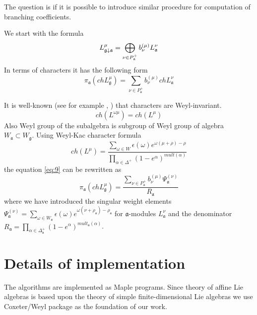 \documentclass[a4paper,12pt]{article}
\theoremstyle{definition} \newtheorem{Def}{Definition}
\begin{document}
The question is if it is possible to introduce similar procedure for
computation of branching coefficients. 

We start with the formula
\begin{equation}
  \label{eq:6}
  L_{\frak{g}\downarrow \frak{a}}^{\mu }=\bigoplus\limits_{\nu \in P_{\frak{a}%
    }^{+}}b_{\nu }^{\left( \mu \right) }L_{\frak{a}}^{\nu }
\end{equation}
In terms of characters it has the following form
\begin{equation}
  \label{eq:9}
  \pi_{\mathfrak{a}}(ch L^{\mu}_{\mathfrak{g}})=\sum_{\nu\in P^{+}_{\mathfrak{a}}}b^{(\mu)}_{\nu} ch L^{\nu}_{\mathfrak{a}}
\end{equation}

It is well-known (see for example \cite{wakimoto2001idl}, \cite{kac1990idl}) that characters are Weyl-invariant.
\begin{equation}
  \label{eq:8}
  ch(L^{\omega\mu})=ch(L^{\mu})
\end{equation}
Also Weyl group of the subalgebra is subgroup of Weyl group of algebra $W_{\mathfrak{a}}\subset W_{\mathfrak{g}}$.
Using Weyl-Kac character formula
\begin{equation}
  \label{eq:11}
  ch(L^{\mu})=\frac{\sum_{\omega\in W}\epsilon(\omega)e^{\omega(\mu+\rho)-\rho}}{\prod_{\alpha\in \Delta^{+}}(1-e^{\alpha})^{mult(\alpha)}}
\end{equation}
the equation \eqref{eq:9} can be rewritten as
\begin{equation}
  \label{eq:10}
  \pi_{\mathfrak{a}}(ch L^{\mu}_{\mathfrak{g}})=\frac{\sum_{\nu\in P^{+}_{\mathfrak{a}}}b^{(\mu)}_{\nu} \Psi^{(\nu)}_{\mathfrak{a}}}{R_{\mathfrak{a}}}
\end{equation}
where we have introduced the singular weight elements $\Psi^{(\nu)}_{\mathfrak{a}}=\sum_{\omega\in W_{\mathfrak{a}}}\epsilon(\omega)e^{\omega(\nu+\rho_{\mathfrak{a}})-\rho_{\mathfrak{a}}}$ for $\mathfrak{a}$-modules $L^{\nu}_{\mathfrak{a}}$ and the denominator $R_{\mathfrak{a}}=\prod_{\alpha\in \Delta^{+}_{\mathfrak{a}}}(1-e^{\alpha})^{mult_{\mathfrak{a}}(\alpha)}$. 



\section{Details of implementation}
\label{sec:details-implementation}

The algorithms are implemented as Maple programs. Since theory of
affine Lie algebras is based upon the theory of simple
finite-dimensional Lie algebras we use Coxeter/Weyl package
\cite{stembridge1995mps} as the foundation of our work.
\end{document}
